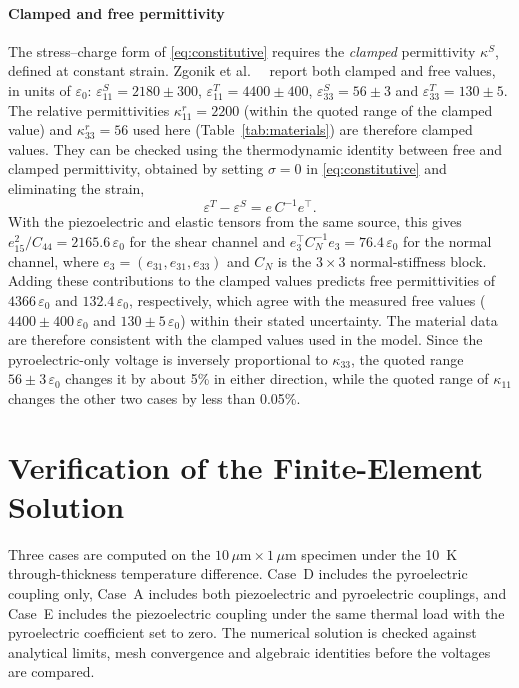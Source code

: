 \documentclass[a4paper,12pt]{elsarticle}
\begin{document}
\paragraph{Clamped and free permittivity}
The stress--charge form of \eqref{eq:constitutive} requires the \emph{clamped}
permittivity $\kappa^S$, defined at constant strain. Zgonik et al.\
~\cite{Zgonik1994} report both clamped and free values, in units of $\varepsilon_0$:
$\varepsilon_{11}^S=2180\pm300$, $\varepsilon_{11}^T=4400\pm400$,
$\varepsilon_{33}^S=56\pm3$ and $\varepsilon_{33}^T=130\pm5$. The relative
permittivities $\kappa_{11}^r=2200$ (within the quoted range of the clamped value)
and $\kappa_{33}^r=56$ used here (Table~\ref{tab:materials}) are therefore clamped
values. They can be checked using the thermodynamic identity between free and clamped
permittivity, obtained by setting $\sigma=0$ in \eqref{eq:constitutive} and eliminating
the strain,
\begin{equation}
\varepsilon^T-\varepsilon^S=e\,C^{-1}e^{\!\top}.
\label{eq:dielectric-identity}
\end{equation}
With the piezoelectric and elastic tensors from the same source, this gives
$e_{15}^2/C_{44}=2165.6\,\varepsilon_0$ for the shear channel and
$e_3^{\!\top}C_N^{-1}e_3=76.4\,\varepsilon_0$ for the normal channel, where
$e_3=(e_{31},e_{31},e_{33})$ and $C_N$ is the $3\times3$ normal-stiffness block.
Adding these contributions to the clamped values predicts free permittivities of
$4366\,\varepsilon_0$ and $132.4\,\varepsilon_0$, respectively, which agree with the
measured free values
($4400\pm400\,\varepsilon_0$ and $130\pm5\,\varepsilon_0$) within their stated
uncertainty. The material data are therefore consistent with the clamped values used
in the model. Since the pyroelectric-only voltage is inversely proportional to
$\kappa_{33}$, the quoted range $56\pm3\,\varepsilon_0$ changes it by about 5\% in
either direction, while the quoted range of $\kappa_{11}$ changes the other two cases
by less than 0.05\%.

\section{Verification of the Finite-Element Solution}
\label{sec:verification}

Three cases are computed on the $10\,\mu\text{m}\times1\,\mu\text{m}$ specimen under the
10~K through-thickness temperature difference. Case~D includes the pyroelectric
coupling only, Case~A includes both piezoelectric and pyroelectric couplings, and
Case~E includes the piezoelectric coupling under the same thermal load with the
pyroelectric coefficient set to zero. The numerical solution is checked against analytical limits, mesh convergence
and algebraic identities before the voltages are compared.
\end{document}
